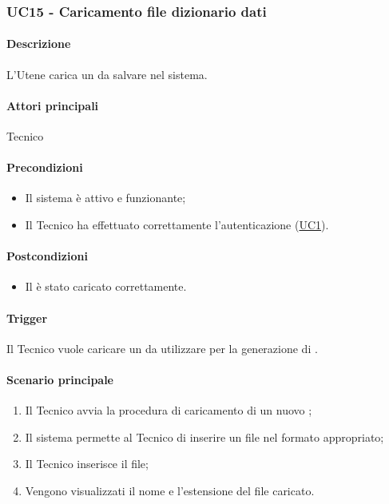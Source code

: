 \subsubsection{UC15 - Caricamento file dizionario dati}\label{UC15}

\paragraph*{Descrizione}
L'Utene carica un  da salvare nel sistema.

\paragraph*{Attori principali}
Tecnico

\paragraph*{Precondizioni}
\begin{itemize}
  \item Il sistema è attivo e funzionante;
  \item Il Tecnico ha effettuato correttamente l'autenticazione (\hyperref[UC1]{UC1}).
\end{itemize}

\paragraph*{Postcondizioni}
\begin{itemize}
  \item Il  è stato caricato correttamente.
\end{itemize}

\paragraph*{Trigger}
Il Tecnico vuole caricare un  da utilizzare per la generazione di .

\paragraph*{Scenario principale}
\begin{enumerate}
  \item Il Tecnico avvia la procedura di caricamento di un nuovo ;
  \item Il sistema permette al Tecnico di inserire un file nel formato appropriato;
  \item Il Tecnico inserisce il file;
  \item Vengono visualizzati il nome e l'estensione del file caricato.
\end{enumerate}
